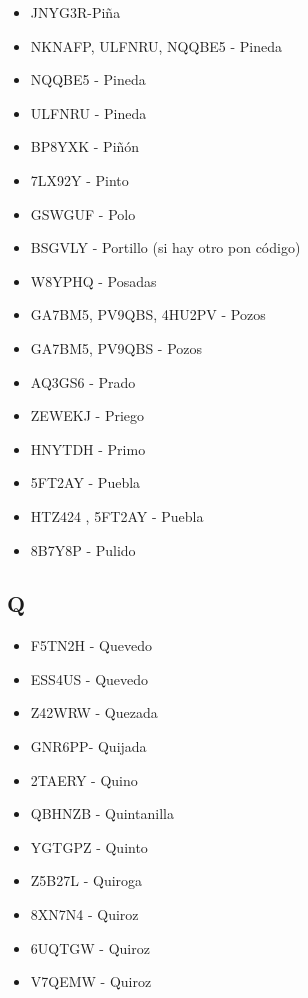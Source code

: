 \begin{itemize}[leftmargin=*,nosep]
\item JNYG3R-Piña
\item NKNAFP, ULFNRU, NQQBE5 - Pineda
\item NQQBE5 - Pineda
\item ULFNRU - Pineda
\item BP8YXK - Piñón
\item 7LX92Y - Pinto
\item GSWGUF - Polo
\item BSGVLY - Portillo (si hay otro pon código)
\item W8YPHQ - Posadas
\item GA7BM5, PV9QBS, 4HU2PV - Pozos
\item GA7BM5, PV9QBS  -  Pozos
\item AQ3GS6   -  Prado
\item ZEWEKJ  -  Priego
\item HNYTDH - Primo
\item 5FT2AY  -  Puebla
\item HTZ424 , 5FT2AY - Puebla
\item 8B7Y8P - Pulido
\end{itemize}

\subsection*{Q}
\begin{itemize}[leftmargin=*,nosep]
\item F5TN2H - Quevedo
\item ESS4US - Quevedo
\item Z42WRW  -  Quezada
\item GNR6PP- Quijada
\item 2TAERY - Quino
\item QBHNZB - Quintanilla
\item YGTGPZ - Quinto
\item Z5B27L - Quiroga
\item 8XN7N4 -  Quiroz
\item 6UQTGW  -  Quiroz
\item V7QEMW - Quiroz
\end{itemize}

